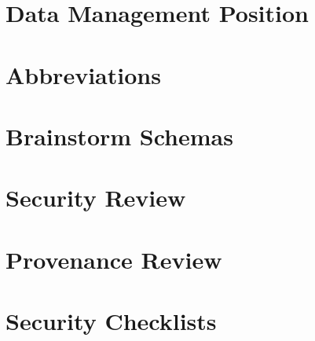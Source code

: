 \documentclass[a4paper]{report}
\begin{document}
	
	
	
	
	
	
	\chapter{Data Management Position}
	\label{position}
	
	
	
	
	
	
	
	
	
	\clearpage
	
	
	\appendix
	\chapter{Abbreviations}
	\label{abbreviations}
	
	
	
	\chapter{Brainstorm Schemas}
	\label{brainstorm-before-after}
	
	
	
	\chapter{Security Review}
	\label{security-review-appendix}
	
	
	
	
	
	\chapter{Provenance Review}
	\label{provenance-review-appendix}
	
	
	
	\chapter{Security Checklists}
	\label{security-appendix}
	
\end{document}
